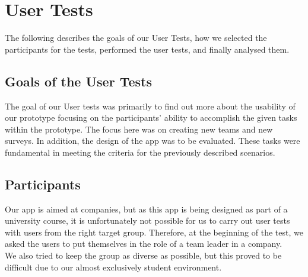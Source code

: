\documentclass[11pt]{article}
\begin{document}
\clearpage

\section{User Tests}
The following describes the goals of our User Tests, how we selected the participants for the tests, performed the user tests, and finally analysed them.


\subsection{Goals of the User Tests}
The goal of our User tests was primarily to find out more about the usability of our prototype focusing on the participants' ability to accomplish the given tasks within the prototype. The focus here was on creating new teams and new surveys. In addition, the design of the app was to be evaluated. These tasks were fundamental in meeting the criteria for the previously described scenarios. 

\subsection{Participants}
Our app is aimed at companies, but as this app is being designed as part of a university course, it is unfortunately not possible for us to carry out user tests with users from the right target group. Therefore, at the beginning of the test, we asked the users to put themselves in the role of a team leader in a company.\\
We also tried to keep the group as diverse as possible, but this proved to be difficult due to our almost exclusively student environment.
\end{document}
